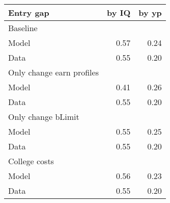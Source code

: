 \begin{tabular}{lrr}
\hline
Entry gap & by IQ  & by yp  \\
\hline
Baseline &   &   \\
Model & 0.57  & 0.24  \\
Data & 0.55  & 0.20  \\
Only change earn profiles &   &   \\
Model & 0.41  & 0.26  \\
Data & 0.55  & 0.20  \\
Only change bLimit &   &   \\
Model & 0.55  & 0.25  \\
Data & 0.55  & 0.20  \\
College costs &   &   \\
Model & 0.56  & 0.23  \\
Data & 0.55  & 0.20  \\
\hline
\end{tabular}%
